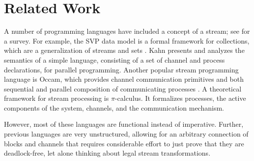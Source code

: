 \section{Related Work}
\label{sec:related}
A number of programming languages have included a concept of a stream;
see \cite{survey97} for a survey.  For example, the SVP data model is
a formal framework for collections, which are a generalization of
streams and sets \cite{Par92}.  Kahn presents and analyzes the
semantics of a simple language, consisting of a set of channel and
process declarations, for parallel programming\cite{Kah74}.  Another
popular stream programming language is Occam, which provides channel
communication primitives and both sequential and parallel composition
of communicating processes \cite{Jif93}.  A theoretical framework for
stream processing is $\pi$-calculus.  It formalizes processes, the
active components of the system, channels, and the communication
mechanism\cite{Pie97}.

However, most of these languages are functional instead of imperative.
Further, previous languages are very unstructured, allowing for an
arbitrary connection of blocks and channels that requires considerable
effort to just prove that they are deadlock-free, let alone thinking
about legal stream transformations.


